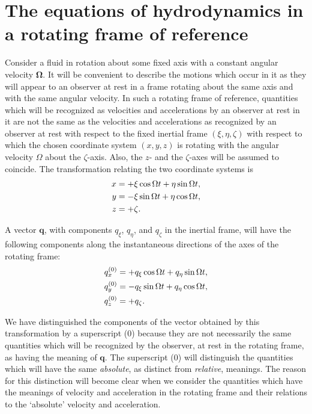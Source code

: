 \section{The equations of hydrodynamics in a rotating frame of reference}\label{sec:3-21}
Consider a fluid in rotation about some fixed axis with a constant angular velocity $\boldsymbol{\Omega}$. It will be convenient to describe the motions which occur in it as they will appear to an observer at rest in a frame rotating about the same axis and with the same angular velocity. In such a rotating frame of reference, quantities which will be recognized as velocities and accelerations by an observer at rest in it are not the same as the velocities and accelerations as recognized by an observer at rest with respect to the fixed inertial frame $(\xi, \eta, \zeta)$ with respect to which the chosen coordinate system $(x,y,z)$ is rotating with the angular velocity $\Omega$ about the $\zeta$-axis. Also, the $z$- and the $\zeta$-axes will be assumed to coincide. The transformation relating the two coordinate systems is
\begin{align}
x &= +\xi\cos\Omega t + \eta\sin\Omega t, \label{eq:3-32}\\
y &= -\xi\sin\Omega t + \eta\cos\Omega t, \notag\\
z &= +\zeta. \notag
\end{align}

A vector $\mathbf{q}$, with components $q_\xi$, $q_\eta$, and $q_\zeta$ in the inertial frame, will have the following components along the instantaneous directions of the axes of the rotating frame:
\begin{align}
q_x^{(0)} &= +q_\xi\cos\Omega t + q_\eta\sin\Omega t, \label{eq:3-33}\\
q_y^{(0)} &= -q_\xi\sin\Omega t + q_\eta\cos\Omega t, \notag\\
q_z^{(0)} &= +q_\zeta. \notag
\end{align}

We have distinguished the components of the vector obtained by this transformation by a superscript (0) because they are not necessarily the same quantities which will be recognized by the observer, at rest in the rotating frame, as having the meaning of $\mathbf{q}$. The superscript (0) will distinguish the quantities which will have the same \emph{absolute}, as distinct from \emph{relative}, meanings. The reason for this distinction will become clear when we consider the quantities which have the meanings of velocity and acceleration in the rotating frame and their relations to the `absolute' velocity and acceleration.

